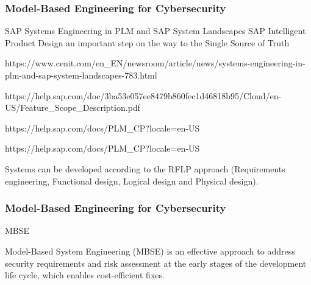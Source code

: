 \begin{frame}
\frametitle{Model-Based Engineering for Cybersecurity}

\begin{block}{SAP}
Systems Engineering in PLM and SAP System Landscapes
SAP Intelligent Product Design  an important step on the way to the Single Source of Truth

\url{}https://www.cenit.com/en_EN/newsroom/article/news/systems-engineering-in-plm-and-sap-system-landscapes-783.html

https://help.sap.com/doc/3ba53e057ee8479b860fec1d46818b95/Cloud/en-US/Feature_Scope_Description.pdf

https://help.sap.com/docs/PLM_CP?locale=en-US

https://help.sap.com/docs/PLM_CP?locale=en-US

Systems can be developed according to the RFLP approach (Requirements engineering, Functional design, Logical design and Physical design).



\end{block}
\end{frame}


\newpage 

\begin{frame}
\frametitle{Model-Based Engineering for Cybersecurity}

\begin{block}{MBSE }


Model-Based System Engineering (MBSE) is an effective approach to address security requirements and risk assessment at the early stages of the development life cycle, which enables cost-efficient fixes. 


\end{block}
\end{frame}


\newpage 

